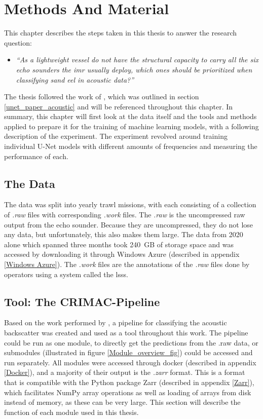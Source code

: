 \chapter{Methods And Material} \label{methods}
    This chapter describes the steps taken in this thesis to answer the research question:
        \begin{itemize}
            \item \textit{“As a lightweight vessel do not have the structural capacity to carry all the six echo sounders the \gls{imr} usually deploy, which ones should be prioritized when classifying sand eel in acoustic data?”}
        \end{itemize}
    
    The thesis followed the work of \citeauthor{brautaset2020acoustic}\cite{brautaset2020acoustic}, which was outlined in section \ref{unet_paper_acoustic} and will be referenced throughout this chapter. In summary, this chapter will first look at the data itself and the tools and methods applied to prepare it for the training of machine learning models, with a following description of the experiment. The experiment revolved around training individual U-Net models with different amounts of frequencies and measuring the performance of each.
    
    \section{The Data}
        The data was split into yearly trawl missions, with each consisting of a collection of \textit{.raw} files with corresponding \textit{.work} files. The \textit{.raw} is the uncompressed raw output from the echo sounder. Because they are uncompressed, they do not lose any data, but unfortunately, this also makes them large. The data from 2020 alone which spanned three months took 240 GB of storage space and was accessed by downloading it through Windows Azure (described in appendix \ref{Windows Azure}). The \textit{.work} files are the annotations of the \textit{.raw} files done by operators using a system called the \Gls{lsss}\cite{lsss}. 
    
    \section{Tool: The CRIMAC-Pipeline}
        Based on the work performed by \citeauthor{brautaset2020acoustic}\cite{brautaset2020acoustic}, a pipeline for classifying the acoustic backscatter was created\cite{crimac_pipeline} and used as a tool throughout this work. The pipeline could be run as one module, to directly get the predictions from the .raw data, or submodules (illustrated in figure \ref{Module_overview_fig}) could be accessed and run separately. All modules were accessed through docker (described in appendix \ref{Docker}), and a majority of their output is the \textit{.zarr} format. This is a format that is compatible with the Python package Zarr (described in appendix \ref{Zarr}), which facilitates NumPy array operations as well as loading of arrays from disk instead of memory, as these can be very large. This section will describe the function of each module used in this thesis.
        
